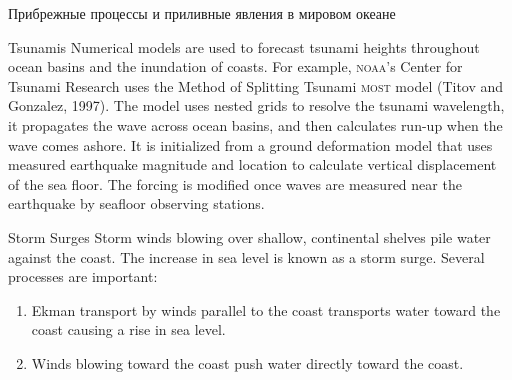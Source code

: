 \begin{chapter}{Прибрежные процессы и приливные явления в мировом океане}
\begin{section}{Tsunamis}
Numerical models are used to forecast tsunami heights throughout ocean
basins and the inundation of coasts. For example, \textsc{noaa}'s
Center for Tsunami Research uses the Method of Splitting Tsunami
\textsc{most} model (Titov and Gonzalez, 1997). The model uses nested
grids to resolve the tsunami wavelength, it propagates the wave across
ocean basins, and then calculates run-up when the wave comes
ashore. It is initialized from a ground deformation model that uses
measured earthquake magnitude and location to calculate vertical
displacement of the sea floor. The forcing is modified once waves are
measured near the earthquake by seafloor observing stations.
%
\end{section}

\begin{section}{Storm Surges}
Storm winds blowing over shallow, continental
shelves pile water against the coast. The increase in sea level is
known as a storm surge. Several processes are important:
%
%
\begin{enumerate}
\item 
Ekman transport by winds parallel to the coast
transports water toward the coast causing a rise in sea level.
%

\item 
Winds blowing toward the coast push water directly toward the coast.
%


\end{enumerate}
\end{section}
\end{chapter}
